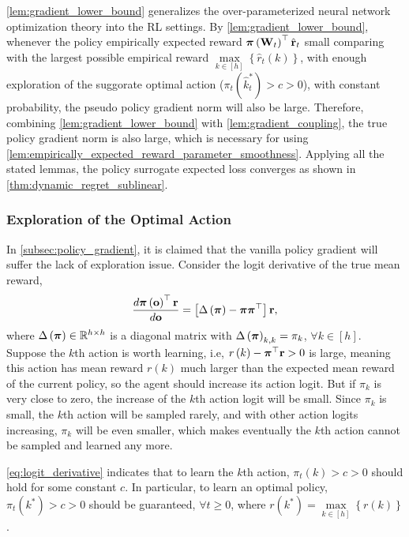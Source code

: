 \cref{lem:gradient_lower_bound} generalizes the over-parameterized neural network optimization theory into the RL settings. By \cref{lem:gradient_lower_bound}, whenever the policy empirically expected reward ${\boldsymbol{\pi}}\left( {\mathbf{W}}_t \right)^\top \hat{{\mathbf{r}}}_t$ small comparing with the largest possible empirical reward $\max\limits_{k \in \left[h\right]}\left\{ \hat{r}_{t}\left(k\right) \right\}$, with enough exploration of the suggorate optimal action ($\pi_t\left(\hat{k}_t^*\right) > c > 0$), with constant probability, the pseudo policy gradient norm will also be large. Therefore, combining \cref{lem:gradient_lower_bound} with \cref{lem:gradient_coupling}, the true policy gradient norm is also large, which is necessary for using \cref{lem:empirically_expected_reward_parameter_smoothness}. Applying all the stated lemmas, the policy surrogate expected loss converges as shown in \cref{thm:dynamic_regret_sublinear}.

\subsubsection{Exploration of the Optimal Action}
\label{subsubsec:exploration_in_policy_learning}

In \cref{subsec:policy_gradient}, it is claimed that the vanilla policy gradient will suffer the lack of exploration issue. Consider the logit derivative of the true mean reward,
\begin{equation}
\label{eq:logit_derivative}
\begin{split}
    \frac{d {\boldsymbol{\pi}}\left( {\mathbf{o}} \right)^\top {\mathbf{r}}}{d {\mathbf{o}}} = \left[ \Delta\left( {\boldsymbol{\pi}} \right) - {\boldsymbol{\pi}} {\boldsymbol{\pi}}^\top \right] {\mathbf{r}},
\end{split}
\end{equation}
where $\Delta\left( {\boldsymbol{\pi}} \right) \in {\mathbb{R}}^{h \times h}$ is a diagonal matrix with $\Delta\left( {\boldsymbol{\pi}} \right)_{k,k} = \pi_{k}$, $\forall k \in [h]$. Suppose the $k$th action is worth learning, i.e, $r\left(k\right) - {\boldsymbol{\pi}}^\top {\mathbf{r}} > 0$ is large, meaning this action has mean reward $r\left(k\right)$ much larger than the expected mean reward of the current policy, so the agent should increase its action logit. But if $\pi_{k}$ is very close to zero, the increase of the $k$th action logit will be small. Since $\pi_{k}$ is small, the $k$th action will be sampled rarely, and with other action logits increasing, $\pi_{k}$ will be even smaller, which makes eventually the $k$th action cannot be sampled and learned any more.

\cref{eq:logit_derivative} indicates that to learn the $k$th action, $\pi_{t}\left(k\right) > c > 0$ should hold for some constant $c$. In particular, to learn an optimal policy, $\pi_{t}\left(k^*\right) > c > 0$ should be guaranteed, $\forall t \ge 0$, where $r\left(k^*\right) = \max\limits_{k \in \left[ h \right]}\left\{ r\left(k\right) \right\}$.

